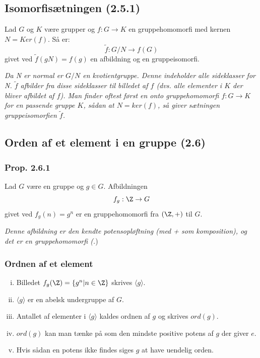 \subsection{Isomorfisætningen  (2.5.1)}
\label{isomorfitheorem}
Lad $G$ og $K$ være grupper og $f: G \rightarrow K$ en gruppehomomorfi med
kernen $N = Ker(f)$. Så er:
\begin{equation*}
  \tilde{f}: G/N \rightarrow f(G)
\end{equation*}
givet ved $\tilde{f}(gN) = f(g)$ en afbildning og en gruppeisomorfi.

\textit{Da N er normal er $G/N$ en kvotientgruppe. Denne indeholder alle
sideklasser for N. $\tilde{f}$ afbilder fra disse sideklasser til billedet af
$f$ (dvs. alle elementer i $K$ der bliver afbildet af $f$). Man finder oftest
først en onto gruppehomomorfi $f: G \rightarrow K$ for en passende gruppe $K$,
sådan at $N = ker(f)$, så giver sætningen gruppeisomorfien $\tilde{f}$.}

\subsection{Orden af et element i en gruppe (2.6)}
\subsubsection{Prop. 2.6.1}
\label{2.6.1}
Lad $G$ være en gruppe og $g \in G$. Afbildningen
\begin{equation*}
  f_g: \Z \rightarrow G
\end{equation*}
givet ved $f_g(n) = g^n$ er en gruppehomomorfi fra $(\Z, +)$ til $G$.

\textit{Denne afbildning er den kendte potensopløftning (med + som komposition),
og det er en gruppehomomorfi (.})

\subsubsection{Ordnen af et element}
\label{ord(g)}
\begin{enumerate}[(i)]
  \item Billedet $f_g(\Z) = \{g^n | n \in \Z\}$ skrives $\langle g \rangle$.
  \item $\langle g \rangle$ er en abelsk undergruppe af $G$.
  \item Antallet af elementer i $\langle g \rangle$ kaldes ordnen af $g$ og
  skrives $ord(g)$.
  \item $ord(g)$ kan man tænke på som den mindste positive potens af $g$ der
  giver $e$.
  \item Hvis sådan en potens ikke findes siges $g$ at have uendelig orden.
\end{enumerate}


